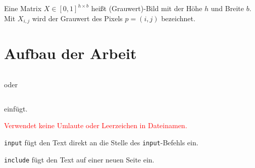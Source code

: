 \begin{defi}
    \label{def:image}
    Eine Matrix $X \in [0,1]^{h \times b}$ heißt (Grauwert)-Bild mit der Höhe $h$ und Breite $b$. Mit $X_{i,j}$ wird der Grauwert des Pixels $p=(i,j)$ bezeichnet.
\end{defi}
\section*{Aufbau der Arbeit}
\begin{verbatim}\end{verbatim}

\bigskip
oder

\bigskip
\begin{verbatim}\end{verbatim}
einfügt.

\bigskip
\noindent\textcolor{red}{Verwendet keine Umlaute oder Leerzeichen in Dateinamen.}

\noindent\texttt{input} fügt den Text direkt an die Stelle des \texttt{input}-Befehls ein.

\noindent\texttt{include} fügt den Text auf einer neuen Seite ein. 
